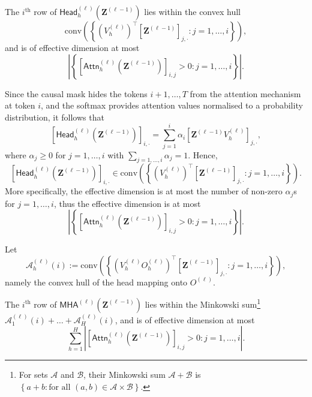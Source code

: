 \begin{lemma}\label{lem:geometry_attention}
    The $i^\text{th}$ row of $\mathsf{Head}_h^{(\ell)}\left(\mathbf{Z}^{(\ell-1)}\right)$ lies within the convex hull $$\mathrm{conv}\left(\left\{\left(V_h^{(\ell)}\right)^\top\left[\mathbf{Z}^{(\ell-1)}\right]_{j,\cdot}:j=1,\dots,i\right\}\right),$$and is of effective dimension at most $$\left\vert\left\{\left[\mathsf{Attn}_h^{(\ell)}\left(\mathbf{Z}^{(\ell-1)}\right)\right]_{i,j}>0:j=1,\dots,i\right\}\right\vert.$$
\end{lemma}

\begin{tproof}
    Since the causal mask hides the tokens $i+1,\dots,T$ from the attention mechanism at token $i$, and the softmax provides attention values normalised to a probability distribution, it follows that $$\left[\mathsf{Head}_h^{(\ell)}\left(\mathbf{Z}^{(\ell-1)}\right)\right]_{i,\cdot}=\sum_{j=1}^i\alpha_i\left[\mathbf{Z}^{(\ell-1)}V_h^{(\ell)}\right]_{j,\cdot},$$where $\alpha_j\geq0$ for $j=1,\dots,i$ with $\sum_{j=1,\dots,i}\alpha_j=1$. Hence, $$\left[\mathsf{Head}_h^{(\ell)}\left(\mathbf{Z}^{(\ell-1)}\right)\right]_{i,\cdot}\in\mathrm{conv}\left(\left\{\left(V_h^{(\ell)}\right)^\top\left[\mathbf{Z}^{(\ell-1)}\right]_{j,\cdot}:j=1,\dots,i\right\}\right).$$More specifically, the effective dimension is at most the number of non-zero $\alpha_j$s for $j=1,\dots,i$, thus the effective dimension is at most $$\left\vert\left\{\left[\mathsf{Attn}_h^{(\ell)}\left(\mathbf{Z}^{(\ell-1)}\right)\right]_{i,j}>0:j=1,\dots,i\right\}\right\vert.$$
\end{tproof}

Let $$\mathcal{A}_h^{(\ell)}(i):=\mathrm{conv}\left(\left\{\left(V_h^{(\ell)}O_h^{(\ell)}\right)^\top\left[\mathbf{Z}^{(\ell-1)}\right]_{j,\cdot}:j=1,\dots,i\right\}\right),$$namely the convex hull of the head mapping onto $O^{(\ell)}$.

\begin{theorem}\label{thm:geometry_multi_head_attention}
    The $i^\text{th}$ row of $\mathsf{MHA}^{(\ell)}\left(\mathbf{Z}^{(\ell-1)}\right)$ lies within the Minkowski sum\footnote{For sets $\mathcal{A}$ and $\mathcal{B}$, their Minkowski sum $\mathcal{A}+\mathcal{B}$ is $\left\{a+b:\text{for all }(a,b)\in\mathcal{A}\times\mathcal{B}\right\}$.}$\mathcal{A}_1^{(\ell)}(i)+\dots+\mathcal{A}_H^{(\ell)}(i)$, and is of effective dimension at most
    \begin{equation}\label{eq:mha_id}
        \sum_{h=1}^H\left\vert\left[\mathsf{Attn}_h^{(\ell)}\left(\mathbf{Z}^{(\ell-1)}\right)\right]_{i,j}>0:j=1,\dots,i\right\vert.
    \end{equation}
\end{theorem}

